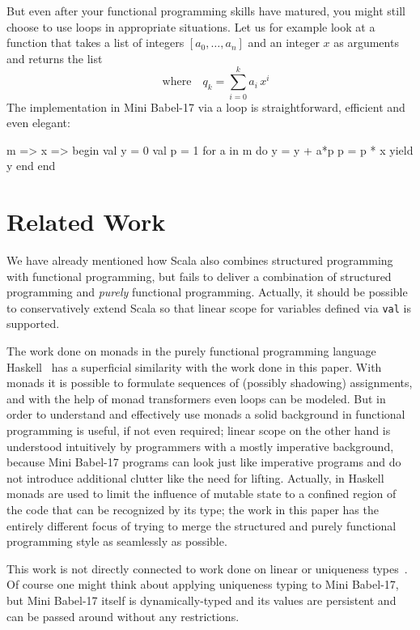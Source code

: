 \documentclass{llncs}
\newcommand{\bsrc}[1] {\lstinline!#1!}
\begin{document}
But even after your functional programming skills have matured, you might still choose to use loops in appropriate situations. Let us for example look at a function that takes a list of integers $[a_0, \ldots, a_n]$ and an integer $x$ as arguments and returns the list
\begin{displaymath}
	[q_0, \ldots, q_n] \quad \text{where} \quad q_k = \sum_{i=0}^k a_i\, x^i
\end{displaymath}
The implementation in Mini Babel-17 via a loop is straightforward, efficient and even elegant:
\begin{babellisting}
m => x => begin
              val y = 0
              val p = 1
  	      for a in m do 
  	        y = y + a*p
	        p = p * x
  	        yield y
	      end
	   end
\end{babellisting}

\section{Related Work}
We have already mentioned how Scala also combines structured programming with functional programming, but fails to deliver a combination of structured programming and \emph{purely} functional programming. Actually, it should be possible to conservatively extend Scala so that linear scope for variables defined via \bsrc{val} is supported.

The work done on monads in the purely functional programming language Haskell~\cite{monads} has a superficial similarity with the work done in this paper. With monads it is possible to formulate sequences of (possibly shadowing) assignments, and with the help of monad transformers even loops can be modeled. But in order to understand and effectively use monads a solid background in functional programming is useful, if not even required; linear scope on the other hand is understood intuitively by programmers with a mostly imperative background, because Mini Babel-17 programs can look just like imperative programs and do not introduce additional clutter like the need for lifting.
Actually, in Haskell monads are used to limit the influence of mutable state to a confined region of the code that can be recognized by its type; the work in this paper has  the entirely different focus of trying to merge the structured and purely functional programming style as seamlessly as possible.

This work is not directly connected to work done on linear or uniqueness types~\cite{lineartypes}. Of course one might think about applying uniqueness typing to Mini Babel-17, but Mini Babel-17 itself is dynamically-typed and its values are persistent and can be passed around without any restrictions.
\end{document}
